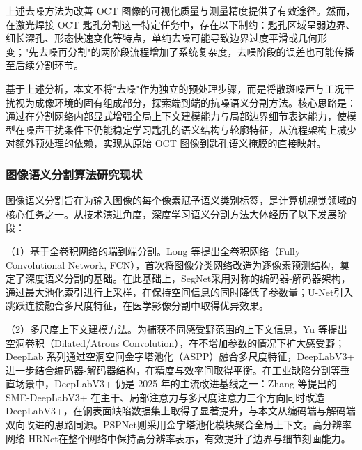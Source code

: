 上述去噪方法为改善 OCT 图像的可视化质量与测量精度提供了有效途径。然而，在激光焊接 OCT 匙孔分割这一特定任务中，存在以下制约：匙孔区域呈弱边界、细长深孔、形态快速变化等特点，单纯去噪可能导致边界过度平滑或几何形变；"先去噪再分割"的两阶段流程增加了系统复杂度，去噪阶段的误差也可能传播至后续分割环节。

基于上述分析，本文不将"去噪"作为独立的预处理步骤，而是将散斑噪声与工况干扰视为成像环境的固有组成部分，探索端到端的抗噪语义分割方法。核心思路是：通过在分割网络内部显式增强全局上下文建模能力与局部边界细节表达能力，使模型在噪声干扰条件下仍能稳定学习匙孔的语义结构与轮廓特征，从流程架构上减少对额外预处理的依赖，实现从原始 OCT 图像到匙孔语义掩膜的直接映射。

\subsubsection{图像语义分割算法研究现状}
图像语义分割旨在为输入图像的每个像素赋予语义类别标签，是计算机视觉领域的核心任务之一。从技术演进角度，深度学习语义分割方法大体经历了以下发展阶段：

（1）基于全卷积网络的端到端分割。Long 等提出全卷积网络（Fully Convolutional Network, FCN），首次将图像分类网络改造为逐像素预测结构，奠定了深度语义分割的基础。在此基础上，SegNet采用对称的编码器-解码器架构，通过最大池化索引进行上采样，在保持空间信息的同时降低了参数量；U-Net引入跳跃连接融合多尺度特征，在医学影像分割中取得优异效果。

（2）多尺度上下文建模方法。为捕获不同感受野范围的上下文信息，Yu 等提出空洞卷积（Dilated/Atrous Convolution），在不增加参数的情况下扩大感受野；DeepLab 系列通过空洞空间金字塔池化（ASPP）融合多尺度特征，DeepLabV3+ 进一步结合编码器-解码器结构，在精度与效率间取得平衡。在工业缺陷分割等垂直场景中，DeepLabV3+ 仍是 2025 年的主流改进基线之一：Zhang 等提出的 SME-DeepLabV3+ 在主干、局部注意力与多尺度注意力三个方向同时改造 DeepLabV3+，在钢表面缺陷数据集上取得了显著提升，与本文从编码端与解码端双向改进的思路同源。PSPNet则采用金字塔池化模块聚合全局上下文。高分辨率网络 HRNet在整个网络中保持高分辨率表示，有效提升了边界与细节刻画能力。

